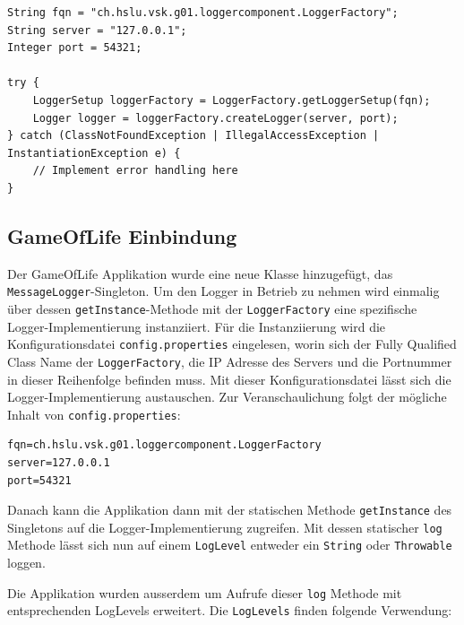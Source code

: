 \documentclass[12pt,a4paper,twosided]{scrartcl}
\begin{document}
\begin{verbatim}
String fqn = "ch.hslu.vsk.g01.loggercomponent.LoggerFactory";
String server = "127.0.0.1";
Integer port = 54321;

try {
	LoggerSetup loggerFactory = LoggerFactory.getLoggerSetup(fqn);
	Logger logger = loggerFactory.createLogger(server, port);
} catch (ClassNotFoundException | IllegalAccessException | InstantiationException e) {
	// Implement error handling here
}
\end{verbatim}

\subsection{GameOfLife Einbindung}
Der GameOfLife Applikation wurde eine neue Klasse hinzugefügt, das \texttt{MessageLogger}-Singleton. Um den Logger in Betrieb zu nehmen wird einmalig über dessen \texttt{getInstance}-Methode mit der \texttt{LoggerFactory} eine spezifische Logger-Implementierung instanziiert. Für die Instanziierung wird die Konfigurationsdatei \texttt{config.properties} eingelesen, worin sich der Fully Qualified Class Name der \texttt{LoggerFactory}, die IP Adresse des Servers und die Portnummer in dieser Reihenfolge befinden muss. Mit dieser Konfigurationsdatei lässt sich die Logger-Implementierung austauschen. Zur Veranschaulichung folgt der mögliche Inhalt von \texttt{config.properties}:

\begin{verbatim}
fqn=ch.hslu.vsk.g01.loggercomponent.LoggerFactory
server=127.0.0.1
port=54321
\end{verbatim}

Danach kann die Applikation dann mit der statischen Methode \texttt{getInstance} des Singletons auf die Logger-Implementierung zugreifen. Mit dessen statischer \texttt{log} Methode lässt sich nun auf einem \texttt{LogLevel} entweder ein \texttt{String} oder \texttt{Throwable} loggen.

Die Applikation wurden ausserdem um Aufrufe dieser \texttt{log} Methode mit entsprechenden LogLevels erweitert. Die \texttt{LogLevels} finden folgende Verwendung:
\end{document}

